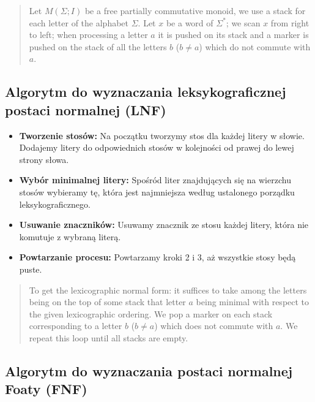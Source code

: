 \documentclass[11pt]{article}
\begin{document}
\begin{quote}
Let \(M(\Sigma; I)\) be a free partially commutative monoid, we use a
stack for each letter of the alphabet \(\Sigma\). Let \(x\) be a word of
\(\Sigma^*\); we scan \(x\) from right to left; when processing a letter
\(a\) it is pushed on its stack and a marker is pushed on the stack of
all the letters \(b\) (\(b \ne a\)) which do not commute with \(a\).
\end{quote}

    \hypertarget{algorytm-do-wyznaczania-leksykograficznej-postaci-normalnej-lnf}{%
\subsection{Algorytm do wyznaczania leksykograficznej postaci normalnej
(LNF)}\label{algorytm-do-wyznaczania-leksykograficznej-postaci-normalnej-lnf}}

\begin{itemize}
\item
  \textbf{Tworzenie stosów:} Na początku tworzymy stos dla każdej litery
  w słowie. Dodajemy litery do odpowiednich stosów w kolejności od
  prawej do lewej strony słowa.
\item
  \textbf{Wybór minimalnej litery:} Spośród liter znajdujących się na
  wierzchu stosów wybieramy tę, która jest najmniejsza według ustalonego
  porządku leksykograficznego.
\item
  \textbf{Usuwanie znaczników:} Usuwamy znacznik ze stosu każdej litery,
  która nie komutuje z wybraną literą.
\item
  \textbf{Powtarzanie procesu:} Powtarzamy kroki 2 i 3, aż wszystkie
  stosy będą puste.
\end{itemize}

\begin{quote}
To get the lexicographic normal form: it suffices to take among the
letters being on the top of some stack that letter \(a\) being minimal
with respect to the given lexicographic ordering. We pop a marker on
each stack corresponding to a letter \(b\) (\(b \ne a\)) which does not
commute with \(a\). We repeat this loop until all stacks are empty.
\end{quote}

    \hypertarget{algorytm-do-wyznaczania-postaci-normalnej-foaty-fnf}{%
\subsection{Algorytm do wyznaczania postaci normalnej Foaty
(FNF)}\label{algorytm-do-wyznaczania-postaci-normalnej-foaty-fnf}}
\end{document}
